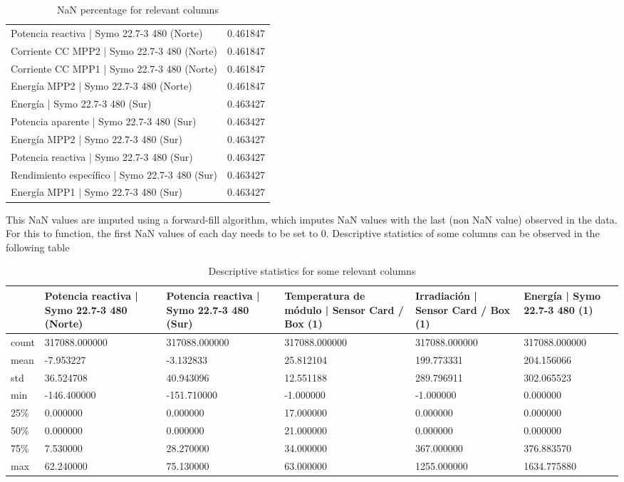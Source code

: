 \documentclass[a4paper,12pt]{article}
\begin{document}
\begin{table}[H]
\begin{tabular}{ll}
Potencia reactiva | Symo 22.7-3 480 (Norte) & 0.461847 \\
Corriente CC MPP2 | Symo 22.7-3 480 (Norte) & 0.461847 \\
Corriente CC MPP1 | Symo 22.7-3 480 (Norte) & 0.461847 \\
Energía MPP2 | Symo 22.7-3 480 (Norte) & 0.461847 \\
Energía | Symo 22.7-3 480 (Sur) & 0.463427 \\
Potencia aparente | Symo 22.7-3 480 (Sur) & 0.463427 \\
Energía MPP2 | Symo 22.7-3 480 (Sur) & 0.463427 \\
Potencia reactiva | Symo 22.7-3 480 (Sur) & 0.463427 \\
Rendimiento específico | Symo 22.7-3 480 (Sur) & 0.463427 \\
Energía MPP1 | Symo 22.7-3 480 (Sur) & 0.463427 \\
\bottomrule
\end{tabular}
\caption{NaN percentage for relevant columns}
\label{tab:nan_percentages}
\end{table}

This NaN values are imputed using a forward-fill algorithm, which imputes NaN values with the last (non NaN value) observed in the data. For this to function, the first NaN values of each day needs to be set to 0. Descriptive statistics of some columns can be observed in the following table

\begin{table}[H]
    \centering
    \begin{tabular}{l p{2.5cm} p{2.5cm} p{2.5cm} p{2.5cm} p{2.5cm}}
        \toprule
        & \textbf{Potencia reactiva | Symo 22.7-3 480 (Norte)} & \textbf{Potencia reactiva | Symo 22.7-3 480 (Sur)} & \textbf{Temperatura de módulo | Sensor Card / Box (1)} & \textbf{Irradiación | Sensor Card / Box (1)} & \textbf{Energía | Symo 22.7-3 480 (1)} \\
        \midrule
        count & 317088.000000 & 317088.000000 & 317088.000000 & 317088.000000 & 317088.000000 \\
        mean & -7.953227 & -3.132833 & 25.812104 & 199.773331 & 204.156066 \\
        std & 36.524708 & 40.943096 & 12.551188 & 289.796911 & 302.065523 \\
        min & -146.400000 & -151.710000 & -1.000000 & -1.000000 & 0.000000 \\
        25\% & 0.000000 & 0.000000 & 17.000000 & 0.000000 & 0.000000 \\
        50\% & 0.000000 & 0.000000 & 21.000000 & 0.000000 & 0.000000 \\
        75\% & 7.530000 & 28.270000 & 34.000000 & 367.000000 & 376.883570 \\
        max & 62.240000 & 75.130000 & 63.000000 & 1255.000000 & 1634.775880 \\
        \bottomrule
    \end{tabular}
   \caption{Descriptive statistics for some relevant columns}
\end{table}
\end{document}
